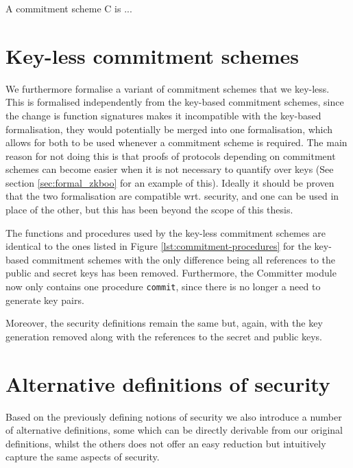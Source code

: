 \begin{definition}[Binding]
  \label{def:commitment:binding}
  A commitment scheme C is ...
\end{definition}


\section{Key-less commitment schemes}
\label{sec:commitment:key-less}
We furthermore formalise a variant of commitment schemes that we key-less. This
is formalised independently from the key-based commitment schemes, since the
change is function signatures makes it incompatible with the key-based
formalisation, they would potentially be merged into one formalisation, which
allows for both to be used whenever a commitment scheme is required. The main
reason for not doing this is that proofs of protocols depending on commitment
schemes can become easier when it is not necessary to quantify over keys (See
section \ref{sec:formal_zkboo} for an example of this). Ideally it should be
proven that the two formalisation are compatible wrt. security, and one can be
used in place of the other, but this has been beyond the scope of this thesis.

The functions and procedures used by the key-less commitment schemes are
identical to the ones listed in Figure \ref{lst:commitment-procedures} for the
key-based commitment schemes with the only difference being all references to
the public and secret keys has been removed. Furthermore, the Committer module
now only contains one procedure \texttt{commit}, since there is no longer a need
to generate key pairs.

Moreover, the security definitions remain the same but, again, with the key
generation removed along with the references to the secret and public keys.

\section{Alternative definitions of security}
\label{sec:commitment:alt-sec}
Based on the previously defining notions of security we also introduce a number
of alternative definitions, some which can be directly derivable from our
original definitions, whilst the others does not offer an easy reduction but
intuitively capture the same aspects of security.

